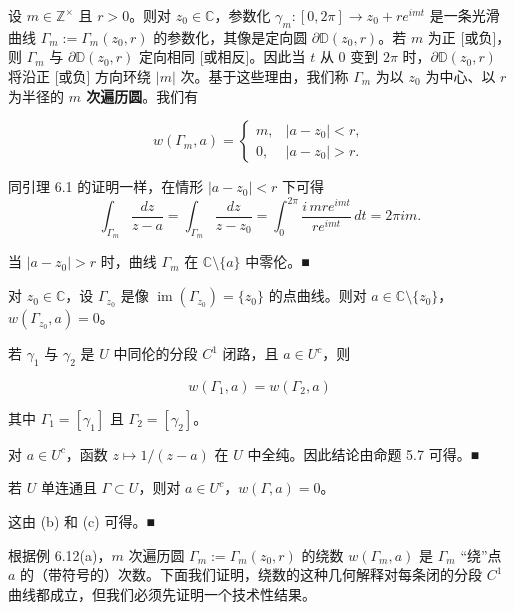 \begin{example}

\begin{items}
\item

设 $ m \in \mathbb{Z}^{\times} $ 且 $ r > 0 $。则对 $ z_{0} \in \mathbb{C} $，参数化 $ \gamma_{m} : [0,2\pi] \to z_{0} + re^{imt} $ 是一条光滑曲线 $ \Gamma_{m} := \Gamma_{m}(z_{0},r) $ 的参数化，其像是定向圆 $ \partial\mathbb{D}(z_{0},r) $。若 $ m $ 为正 [或负]，则 $ \Gamma_{m} $ 与 $ \partial\mathbb{D}(z_{0},r) $ 定向相同 [或相反]。因此当 $ t $ 从 $ 0 $ 变到 $ 2\pi $ 时，$ \partial\mathbb{D}(z_{0},r) $ 将沿正 [或负] 方向环绕 $ |m| $ 次。基于这些理由，我们称 $ \Gamma_{m} $ 为以 $ z_{0} $ 为中心、以 $ r $ 为半径的 \textbf{$ m $ 次遍历圆}。我们有

\begin{equation*}
w(\Gamma_{m},a) = \begin{cases} m , & |a - z_{0}| < r , \\ 0 , & |a - z_{0}| > r . \end{cases}
\end{equation*}

\proofhead
同引理 6.1 的证明一样，在情形 $ |a - z_{0}| < r $ 下可得
\[
\int_{\Gamma_{m}}\frac{dz}{z - a} = \int_{\Gamma_{m}}\frac{dz}{z - z_{0}} = \int_{0}^{2\pi}\frac{i\,mre^{imt}}{re^{imt}}\,dt = 2\pi i m .
\]

当 $ |a - z_{0}| > r $ 时，曲线 $ \Gamma_{m} $ 在 $ \mathbb{C}\setminus\{a\} $ 中零伦。\nobreak\hspace{0.35em}■

\item

对 $ z_{0} \in \mathbb{C} $，设 $ \Gamma_{z_{0}} $ 是像 $ \operatorname{im}(\Gamma_{z_{0}}) = \{z_{0}\} $ 的点曲线。则对 $ a \in \mathbb{C}\setminus\{z_{0}\} $，$ w(\Gamma_{z_{0}},a) = 0 $。

\item

若 $ \gamma_{1} $ 与 $ \gamma_{2} $ 是 $ U $ 中同伦的分段 $ C^{1} $ 闭路，且 $ a \in U^{c} $，则

\[
w(\Gamma_{1},a) = w(\Gamma_{2},a)
\]

其中 $ \Gamma_{1} = [\gamma_{1}] $ 且 $ \Gamma_{2} = [\gamma_{2}] $。

\proofhead
对 $ a \in U^{c} $，函数 $ z \mapsto 1/(z - a) $ 在 $ U $ 中全纯。因此结论由命题 5.7 可得。\nobreak\hspace{0.35em}■
\item

若 $ U $ 单连通且 $ \Gamma \subset U $，则对 $ a \in U^{c} $，$ w(\Gamma,a) = 0 $。

\proofhead
这由 (b) 和 (c) 可得。\nobreak\hspace{0.35em}■
\end{items}

根据例 6.12(a)，$ m $ 次遍历圆 $ \Gamma_{m} := \Gamma_{m}(z_{0},r) $ 的绕数 $ w(\Gamma_{m},a) $ 是 $ \Gamma_{m} $ “绕”点 $ a $ 的（带符号的）次数。下面我们证明，绕数的这种几何解释对每条闭的分段 $ C^{1} $ 曲线都成立，但我们必须先证明一个技术性结果。

\end{example}

